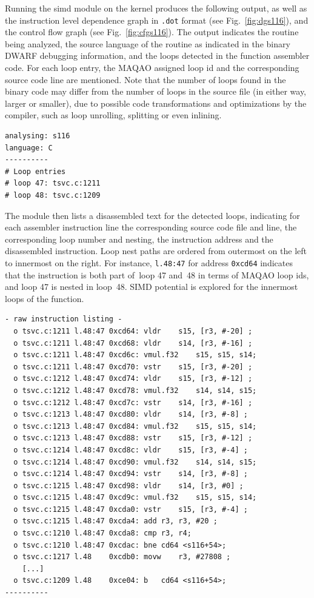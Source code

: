 \documentclass[11pt, a4paper, twoside]{montblanc2}
\begin{document}
Running the simd module on the kernel produces the following output, as well as
the instruction level dependence graph in \texttt{.dot} format (see
Fig.~\ref{fig:dgs116}), and the control flow graph (see Fig.~\ref{fig:cfgs116}). 
The output indicates the routine being analyzed, the
source language of the routine as indicated in the binary DWARF debugging
information, and the loops detected in the function assembler code. For each
loop entry, the MAQAO assigned loop id and the corresponding source code line
are mentioned. Note that the number of loops found in the binary code may differ
from the number of loops in the source file (in either way, larger or smaller), due to possible code
transformations and optimizations by the compiler, such as loop unrolling,
splitting or even inlining. 

\begin{small}
\begin{verbatim}
analysing: s116
language: C
----------
# Loop entries
# loop 47: tsvc.c:1211
# loop 48: tsvc.c:1209
\end{verbatim}
\end{small}

The module then lists a disassembled text for the detected loops, indicating for
each assembler instruction line the corresponding source code file and line, the
corresponding loop number and nesting, the instruction address and the
disassembled instruction. Loop nest paths are ordered from outermost on the left
to innermost on the right. For instance, \verb|l.48:47| for address
\texttt{0xcd64} indicates that the instruction is both part of~loop 47 and~48
in terms of MAQAO loop ids, and loop 47 is nested in loop~48. SIMD potential is
explored for the innermost loops of the function.

\begin{small}
\begin{verbatim}
- raw instruction listing -
  o tsvc.c:1211 l.48:47 0xcd64: vldr	s15, [r3, #-20] ;
  o tsvc.c:1211 l.48:47 0xcd68: vldr	s14, [r3, #-16] ;
  o tsvc.c:1211 l.48:47 0xcd6c: vmul.f32	s15, s15, s14;
  o tsvc.c:1211 l.48:47 0xcd70: vstr	s15, [r3, #-20] ;
  o tsvc.c:1212 l.48:47 0xcd74: vldr	s15, [r3, #-12] ;
  o tsvc.c:1212 l.48:47 0xcd78: vmul.f32	s14, s14, s15;
  o tsvc.c:1212 l.48:47 0xcd7c: vstr	s14, [r3, #-16] ;
  o tsvc.c:1213 l.48:47 0xcd80: vldr	s14, [r3, #-8] ;
  o tsvc.c:1213 l.48:47 0xcd84: vmul.f32	s15, s15, s14;
  o tsvc.c:1213 l.48:47 0xcd88: vstr	s15, [r3, #-12] ;
  o tsvc.c:1214 l.48:47 0xcd8c: vldr	s15, [r3, #-4] ;
  o tsvc.c:1214 l.48:47 0xcd90: vmul.f32	s14, s14, s15;
  o tsvc.c:1214 l.48:47 0xcd94: vstr	s14, [r3, #-8] ;
  o tsvc.c:1215 l.48:47 0xcd98: vldr	s14, [r3, #0] ;
  o tsvc.c:1215 l.48:47 0xcd9c: vmul.f32	s15, s15, s14;
  o tsvc.c:1215 l.48:47 0xcda0: vstr	s15, [r3, #-4] ;
  o tsvc.c:1215 l.48:47 0xcda4: add	r3, r3, #20 ;
  o tsvc.c:1210 l.48:47 0xcda8: cmp	r3, r4;
  o tsvc.c:1210 l.48:47 0xcdac: bne	cd64 <s116+54>;
  o tsvc.c:1217 l.48    0xcdb0: movw	r3, #27808 ;
    [...]
  o tsvc.c:1209 l.48    0xce04: b	cd64 <s116+54>;
----------
\end{verbatim}
\end{small}
\end{document}
